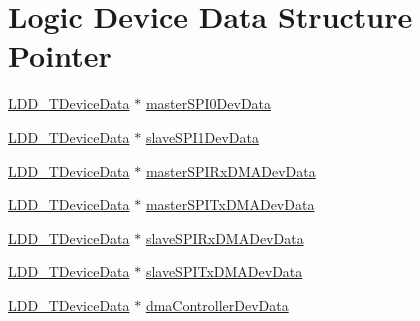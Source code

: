 \hypertarget{group___log_dev_dat_str_ptr}{\section{Logic Device Data Structure Pointer}
\label{group___log_dev_dat_str_ptr}
}
\begin{DoxyCompactItemize}
\item 
\hyperlink{group___p_e___types__module_gac5cf1362f1f0e3a2ce71b1bf2276d091}{L\-D\-D\-\_\-\-T\-Device\-Data} $\ast$ \hyperlink{group___log_dev_dat_str_ptr_ga5813253b5d8cbea8134608f6bcc99819}{master\-S\-P\-I0\-Dev\-Data}
\item 
\hyperlink{group___p_e___types__module_gac5cf1362f1f0e3a2ce71b1bf2276d091}{L\-D\-D\-\_\-\-T\-Device\-Data} $\ast$ \hyperlink{group___log_dev_dat_str_ptr_gad8ac5eb288b57c78161b4c027463a541}{slave\-S\-P\-I1\-Dev\-Data}
\item 
\hyperlink{group___p_e___types__module_gac5cf1362f1f0e3a2ce71b1bf2276d091}{L\-D\-D\-\_\-\-T\-Device\-Data} $\ast$ \hyperlink{group___log_dev_dat_str_ptr_gab6ca91dbd43f844f187227a060a0bb77}{master\-S\-P\-I\-Rx\-D\-M\-A\-Dev\-Data}
\item 
\hyperlink{group___p_e___types__module_gac5cf1362f1f0e3a2ce71b1bf2276d091}{L\-D\-D\-\_\-\-T\-Device\-Data} $\ast$ \hyperlink{group___log_dev_dat_str_ptr_gafd0056caf5103bca68a726f4f8d7b4c3}{master\-S\-P\-I\-Tx\-D\-M\-A\-Dev\-Data}
\item 
\hyperlink{group___p_e___types__module_gac5cf1362f1f0e3a2ce71b1bf2276d091}{L\-D\-D\-\_\-\-T\-Device\-Data} $\ast$ \hyperlink{group___log_dev_dat_str_ptr_ga9f9c068038b7bb68fa3a2e6b426ab473}{slave\-S\-P\-I\-Rx\-D\-M\-A\-Dev\-Data}
\item 
\hyperlink{group___p_e___types__module_gac5cf1362f1f0e3a2ce71b1bf2276d091}{L\-D\-D\-\_\-\-T\-Device\-Data} $\ast$ \hyperlink{group___log_dev_dat_str_ptr_ga4b24fc4b941fe265cc0c37fc63716411}{slave\-S\-P\-I\-Tx\-D\-M\-A\-Dev\-Data}
\item 
\hyperlink{group___p_e___types__module_gac5cf1362f1f0e3a2ce71b1bf2276d091}{L\-D\-D\-\_\-\-T\-Device\-Data} $\ast$ \hyperlink{group___log_dev_dat_str_ptr_gadcb3f32e1d6cb09fb77c28128d59c7f4}{dma\-Controller\-Dev\-Data}
\end{DoxyCompactItemize}
